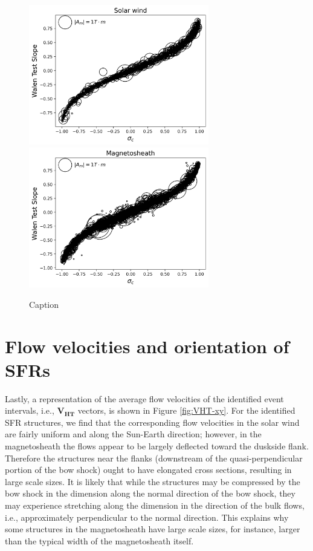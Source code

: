\begin{figure}
    \centering
    \includegraphics[width=0.7\textwidth]{Figures/GS analysis/walenTest_vs_crosshelicity_solarwind.png}
    \includegraphics[width=0.7\textwidth]{Figures/GS analysis/walenTest_vs_crosshelicity_magnetosheath.png}
    \caption[Wal\'en test slope vs. reduced cross helicity]{Caption}
    \label{fig:walen-crosshelicity}
\end{figure}

\section{Flow velocities and orientation of SFRs}
Lastly, a representation of the average flow velocities of the identified event intervals, i.e., $\mathbf{V_{HT}}$ vectors, is shown in Figure \ref{fig:VHT-xy}. For the identified SFR structures, we find that the corresponding flow velocities in the solar wind are fairly uniform and along the Sun-Earth direction; however, in the magnetosheath the flows appear to be largely deflected toward the duskside flank. Therefore the structures near the flanks (downstream of the quasi-perpendicular portion of the bow shock) ought to have elongated cross sections, resulting in large scale sizes. It is likely that while the structures may be compressed by the bow shock in the dimension along the normal direction of the bow shock, they may experience stretching along the dimension in the direction of the bulk flows, i.e., approximately perpendicular to the normal direction. This explains why some structures in the magnetosheath have large scale sizes, for instance, larger than the typical width of the magnetosheath itself.

